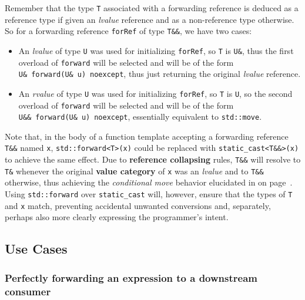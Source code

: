 Remember that the type \texttt{T} associated with a forwarding reference
is deduced as a reference type if given an \emph{lvalue} reference and
as a non-reference type otherwise. So for a forwarding reference
\texttt{forRef} of type \texttt{T\&\&}, we have two cases:
\begin{itemize}
\item{An \emph{lvalue} of type \texttt{U} was used for initializing \texttt{forRef}, so \texttt{T} is \texttt{U\&}, thus the first overload of \texttt{forward} will be selected and will be of the form \texttt{U\&}~\texttt{forward(U\&}~\texttt{u)}~\texttt{noexcept}, thus just returning the original \emph{lvalue} reference.}
\item{An \emph{rvalue} of type \texttt{U} was used for initializing \texttt{forRef}, so \texttt{T} is \texttt{U}, so the second overload of \texttt{forward} will be selected and will be of the form \texttt{U\&\&}~\texttt{forward(U\&}~\texttt{u)}~\texttt{noexcept}, essentially equivalent to \texttt{std::move}.}
\end{itemize}
Note that, in the body of a function template accepting a forwarding
reference \texttt{T\&\&} named \texttt{x}, \texttt{std::forward<T>(x)}
could be replaced with \texttt{static\_cast<T\&\&>(x)} to achieve the
same effect. Due to \textbf{reference collapsing} rules, \texttt{T\&\&}
will resolve to \texttt{T\&} whenever the original \textbf{value
category} of \texttt{x} was an \emph{lvalue} and to \texttt{T\&\&}
otherwise, thus achieving the \emph{conditional move} behavior
elucidated in \textit{} on page~\pageref{description-forwardingref}. Using \texttt{std::forward} over \texttt{static\_cast}
will, however, ensure that the types of \texttt{T} and \texttt{x} match,
preventing accidental unwanted conversions and, separately, perhaps also
more clearly expressing the programmer's intent.

\subsection[Use Cases]{Use Cases}\label{use-cases-forwardingref}

\subsubsection[Perfectly forwarding an expression to a downstream consumer]{Perfectly forwarding an expression to a downstream consumer}\label{perfectly-forwarding-an-expression-to-a-downstream-consumer}


